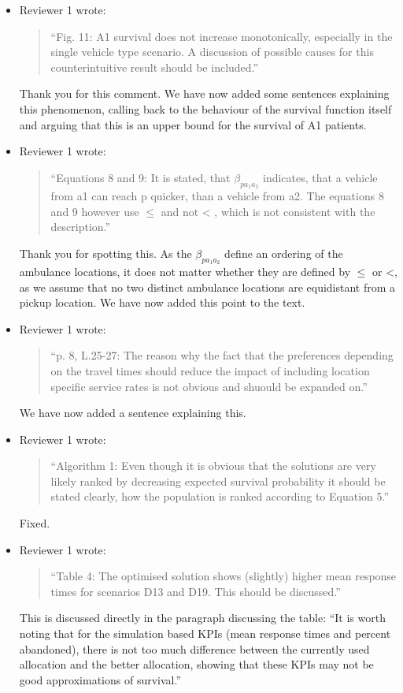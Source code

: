 \documentclass{article}
\begin{document}
\begin{itemize}
\item Reviewer 1 wrote:
\begin{quote}
``Fig. 11: A1 survival does not increase monotonically, especially in the single vehicle type scenario. A discussion of possible causes for this counterintuitive result should be included.''
\end{quote}
Thank you for this comment. We have now added some sentences explaining this phenomenon, calling back to the behaviour of the survival function itself and arguing that this is an upper bound for the survival of A1 patients.

\item Reviewer 1 wrote:
\begin{quote}
``Equations 8 and 9: It is stated, that $\beta_{p a_1 a_2}$ indicates, that a vehicle from a1 can reach p quicker, than a vehicle from a2. The equations 8 and 9 however use $\leq$ and not < , which is not consistent with the description.''
\end{quote}
Thank you for spotting this. As the $\beta_{p a_1 a_2}$ define an ordering of the ambulance locations, it does not matter whether they are defined by $\leq$ or <, as we assume that no two distinct ambulance locations are equidistant from a pickup location. We have now added this point to the text.

\item Reviewer 1 wrote:
\begin{quote}
``p. 8, L.25-27: The reason why the fact that the preferences depending on the travel times should reduce the impact of including location specific service rates is not obvious and shuould be expanded on.''
\end{quote}
We have now added a sentence explaining this.

\item Reviewer 1 wrote:
\begin{quote}
``Algorithm 1: Even though it is obvious that the solutions are very likely ranked by decreasing expected survival probability it should be stated clearly, how the population is ranked according to Equation 5.''
\end{quote}
Fixed.

\item Reviewer 1 wrote:
\begin{quote}
``Table 4: The optimised solution shows (slightly) higher mean response times for scenarios D13 and D19. This should be discussed.''
\end{quote}
This is discussed directly in the paragraph discussing the table: ``It is worth noting that for the simulation based KPIs (mean response times and percent abandoned), there is not too much difference between the currently used allocation and the better allocation, showing that these KPIs may not be good approximations of survival.''


\end{itemize}
\end{document}
